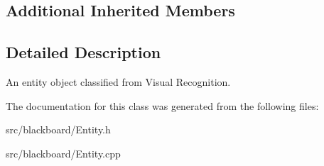 \subsection*{Additional Inherited Members}


\subsection{Detailed Description}
An entity object classified from Visual Recognition. 

The documentation for this class was generated from the following files\+:\begin{DoxyCompactItemize}
\item 
src/blackboard/Entity.\+h\item 
src/blackboard/Entity.\+cpp\end{DoxyCompactItemize}
